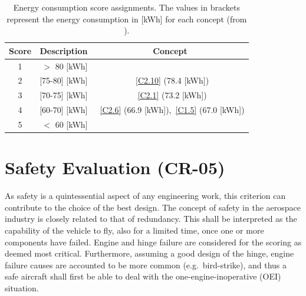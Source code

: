 \begin{table}[ht]
\centering
\caption{Energy consumption score assignments. The values in brackets represent the energy consumption in [{\unit{\kWh}}] for each concept (from ).}
\label{tab:energyconsscore}
\begin{tabular}{c|r|c}
\toprule
  
\textbf{Score} & \textbf{Description} & \textbf{Concept} \\ \bottomrule
\rowcolor[HTML]{FD6864} 
1              & $>$ 80 [\unit{\kWh}]            &                  \\
\rowcolor[HTML]{FCBF7B} 
2              & [75-80] [\unit{\kWh}]           &~\ref{C2.10} (78.4 [\unit{\kWh}])          \\
\rowcolor[HTML]{E0E383} 
3              & [70-75] [\unit{\kWh}]           &~\ref{C2.1} (73.2 [\unit{\kWh}])           \\
\rowcolor[HTML]{A2D07F} 
4              & [60-70] [\unit{\kWh}]           &~\ref{C2.6} (66.9 [\unit{\kWh}]),~\ref{C1.5} (67.0 [\unit{\kWh}])       \\
\rowcolor[HTML]{63BE7B} 
5              & $<$ 60 [\unit{\kWh}]            &                  \\ \toprule
\end{tabular}
\end{table}


\section{Safety Evaluation (CR-05)}

As safety is a quintessential aspect of any engineering work, this criterion can contribute to the choice of the best design.
The concept of safety in the aerospace industry is closely related to that of redundancy.
This shall be interpreted as the capability of the vehicle to fly, also for a limited time, once one or more components have failed.
Engine and hinge failure are considered for the scoring as deemed most critical.
Furthermore, assuming a good design of the hinge, engine failure causes are accounted to be more common (e.g.\ bird-strike), and thus a safe aircraft shall first be able to deal with the one-engine-inoperative (OEI) situation.


